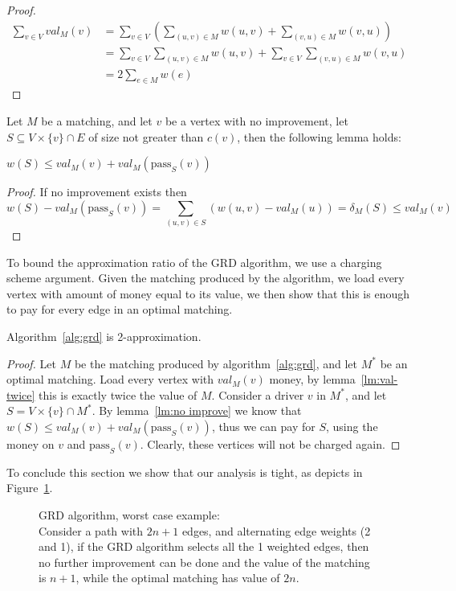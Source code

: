 \begin{proof}
\begin{equation}
\begin{split}
\sum_{v \in V} val_M(v)	& = 
\sum_{v \in V} \left( \sum_{(u, v) \in M} w(u, v) + \sum_{(v, u) \in M} w(v, u) \right)	\\
						& = \sum_{v \in V}\sum_{(u, v) \in M} w(u, v) + 
							\sum_{v \in V}\sum_{(v, u) \in M} w(v, u)					\\
						& = 2 \sum_{e \in M} w(e)
\end{split}
\end{equation}
\end{proof}

Let $M$ be a matching, and let $v$ be a vertex with no improvement,
let $S \subseteq V \times \{v\} \cap E$ of size not greater than $c(v)$,
then the following lemma holds:

\begin{lemma}
\label{lm:no improve}
$w(S) \leq val_M(v) + val_M(\text{pass}_S(v))$
\end{lemma}

\begin{proof}
If no improvement exists then
$$
w(S) - val_M(\text{pass}_S(v))=
\sum_{(u,v) \in S}(w(u,v) - val_M(u)) =
\delta_M(S) 
\leq val_M(v)
$$
\end{proof}

To bound the approximation ratio of the GRD algorithm, 
we use a charging scheme argument.
Given the matching produced by the algorithm, 
we load every vertex with amount of money equal to its value,
we then show that this is enough to pay for every edge in an optimal matching.   

\begin{theorem}
Algorithm~\ref{alg:grd} is 2-approximation.
\end{theorem}

\begin{proof}
Let $M$ be the matching produced by algorithm~\ref{alg:grd}, 
and let $M^*$ be an optimal matching.
Load every vertex with $val_M(v)$ money, 
by lemma~\ref{lm:val-twice} this is exactly twice the value of $M$.
Consider a driver $v$ in $M^*$, and let $S = V \times \{v\} \cap M^*$.
By lemma~\ref{lm:no improve} we know that $w(S) \leq val_M(v) + val_M(\text{pass}_S(v))$,
thus we can pay for $S$, using the money on $v$ and $\text{pass}_S(v)$.
Clearly, these vertices will not be charged again.
\end{proof}

To conclude this section we show that our analysis is tight, 
as depicts in Figure~\ref{fig:grd worst}.
\begin{figure}
\centering

\caption{
\label{fig:grd worst}
GRD algorithm, worst case example: \\
Consider a path with $2n + 1$ edges, 
and alternating edge weights (2 and 1),
if the GRD algorithm selects all the 1 weighted edges,
then no further improvement can be done and the value of the matching is $n + 1$,
while the optimal matching has value of $2n$. 
}
\end{figure}